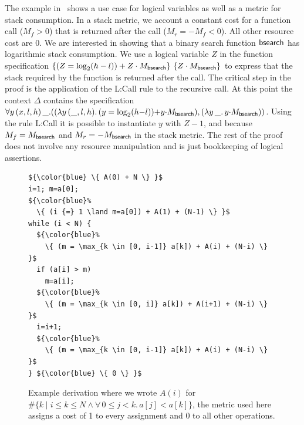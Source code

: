 \documentclass[nocopyrightspace,preprint,pldi]{sigplanconf-pldi15}
\newcommand{\pref}[1]{\prettyref{#1}}
\begin{document}
The example in~\pref{fig:xmplbs} shows a use case for logical
variables as well as a metric for stack consumption. In a stack
metric, we account a constant cost for a function call ($M_f>0$) that
is returned after the call ($M_r = -M_f <0$).  All other resource cost
are $0$.  We are interested in showing that a binary search function
$\mathsf{bsearch}$ has logarithmic stack consumption.  We use a logical
variable $Z$ in the function specification $\{(Z = \log_2(h-l))
  + Z \cdot M_{\mathsf{bsearch}}\}\, \, \{Z \cdot M_{\mathsf{bsearch}}\}$ to express that the stack required by the
function is returned after the call.
%
The critical step in the proof is the application of the
{\sc L:Call} rule to the recursive call.  At this point
the context $\Delta$ contains the specification
$
  \forall y \, (x,l,h) \, \_.
  ( (\lambda y \, (\_, l, h) .\, (y = \log_2(h {-} l)) {+} y {\cdot} M_{\mathsf{bsearch}})
  , (\lambda y \, \_ .\, y {\cdot} M_{\mathsf{bsearch}})
  )
$.
%
Using the rule {\sc L:Call} it is possible to instantiate $y$ with $Z
- 1$, and because $M_f = M_{\mathsf{bsearch}}$ and $M_r =
-M_{\mathsf{bsearch}}$ in the stack metric.  The rest of the proof does
not involve any resource manipulation and is just bookkeeping of
logical assertions.



\begin{figure}
\begin{lstlisting}
${\color{blue} \{ A(0) + N \} }$
i=1; m=a[0];
${\color{blue}%
  \{ (i {=} 1 \land m=a[0]) + A(1) + (N-1) \} }$
while (i < N) {
  ${\color{blue}%
    \{ (m = \max_{k \in [0, i-1]} a[k]) + A(i) + (N-i) \} }$
  if (a[i] > m)
    m=a[i];
  ${\color{blue}%
    \{ (m = \max_{k \in [0, i]} a[k]) + A(i+1) + (N-i) \} }$
  i=i+1;
  ${\color{blue}%
    \{ (m = \max_{k \in [0, i-1]} a[k]) + A(i) + (N-i) \} }$
} ${\color{blue} \{ 0 \} }$
\end{lstlisting}
\caption{Example derivation where we wrote $A(i)$
  for $\#\{ k \mid i \le k \le N \land \forall\, 0\le j<k.\, a[j] < a[k]\}$,
  the metric used here assigns a cost of 1 to every assignment
  and 0 to all other operations.
  }
\label{fig:xmplmax}
\end{figure}
\end{document}
